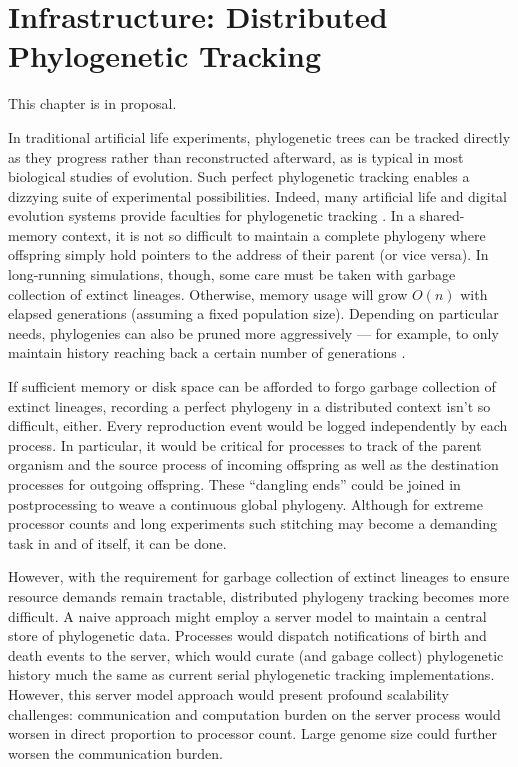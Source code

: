 \chapter{Infrastructure: Distributed Phylogenetic Tracking}
\label{ch:distributed-phylogeny}

\noindent
This chapter is in proposal.


In traditional artificial life experiments, phylogenetic trees can be tracked directly as they progress rather than reconstructed afterward, as is typical in most biological studies of evolution.
Such perfect phylogenetic tracking enables a dizzying suite of experimental possibilities.
Indeed, many artificial life and digital evolution systems provide faculties for phylogenetic tracking \citep{bohm2017mabe,wang2018vine,lalejini2019data}.
In a shared-memory context, it is not so difficult to maintain a complete phylogeny where offspring simply hold pointers to the address of their parent (or vice versa).
In long-running simulations, though, some care must be taken with garbage collection of extinct lineages.
Otherwise, memory usage will grow $O(n)$ with elapsed generations (assuming a fixed population size).
Depending on particular needs, phylogenies can also be pruned more aggressively --- for example, to only maintain history reaching back a certain number of generations \citep{dolson2019modes}.

If sufficient memory or disk space can be afforded to forgo garbage collection of extinct lineages, recording a perfect phylogeny in a distributed context isn't so difficult, either.
Every reproduction event would be logged independently by each process.
In particular, it would be critical for processes to track of the parent organism and the source process of incoming offspring as well as the destination processes for outgoing offspring.
These ``dangling ends'' could be joined in postprocessing to weave a continuous global phylogeny.
Although for extreme processor counts and long experiments such stitching may become a demanding task in and of itself, it can be done.

However, with the requirement for garbage collection of extinct lineages to ensure resource demands remain tractable, distributed phylogeny tracking becomes more difficult.
A naive approach might employ a server model to maintain a central store of phylogenetic data.
Processes would dispatch notifications of birth and death events to the server, which would curate (and gabage collect) phylogenetic history much the same as current serial phylogenetic tracking implementations.
However, this server model approach would present profound scalability challenges: communication and computation burden on the server process would worsen in direct proportion to processor count.
Large genome size could further worsen the communication burden.

